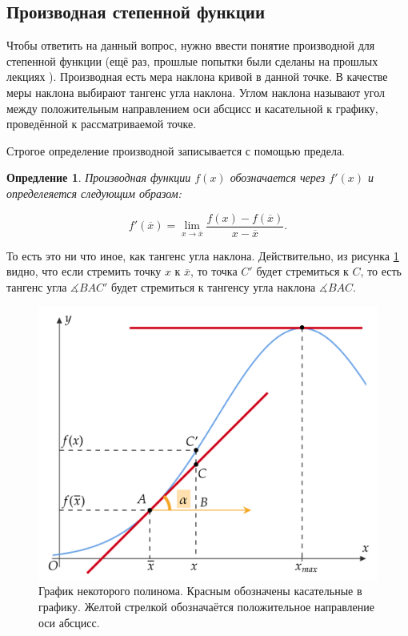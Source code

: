 \documentclass[12pt]{article}
\newtheorem{definition}{Опредление}[section]
\begin{document}
\subsection{Производная степенной функции}
\par Чтобы ответить на данный вопрос, нужно ввести понятие производной для степенной функции (ещё раз, прошлые попытки были сделаны на прошлых лекциях \cite{lim_use}). Производная есть мера наклона кривой в данной точке. В качестве меры наклона выбирают тангенс угла наклона. Углом наклона называют угол между положительным направлением оси абсцисс и касательной к графику, проведённой к рассматриваемой точке.

\par Строгое определение производной записывается с помощью предела. 

\begin{definition}\label{def:1}
	Производная функции $f(x)$ обозначается через $f'(x)$ и определеяется следующим образом:
	
	\begin{equation}
		f'(\overline{x}) = \lim_{x\rightarrow\overline{x}}\dfrac{f(x) - f(\overline{x})}{x - \overline{x}}.
	\end{equation}
\end{definition}

\par То есть это ни что иное, как тангенс угла наклона. Действительно, из рисунка \ref{fig:fig1} видно, что если стремить точку $x$ к $\overline{x}$, то точка $C'$ будет стремиться к $C$, то есть тангенс угла $\measuredangle BAC'$ будет стремиться к тангенсу угла наклона $\measuredangle BAC$.

\begin{figure}[htbp]
	\centering
	\includegraphics[width=1\linewidth]{fig1}
	\caption{График некоторого полинома. Красным обозначены касательные в графику. Желтой стрелкой обозначаётся положительное направление оси абсцисс.}
	\label{fig:fig1}
\end{figure}
\end{document}
